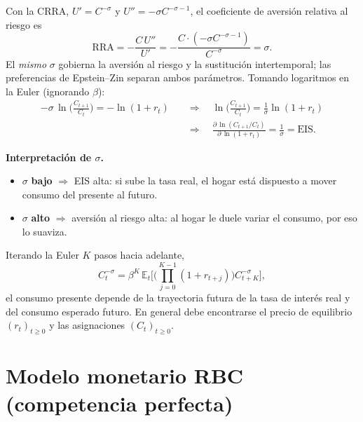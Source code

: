 \documentclass[11pt]{article}
\newenvironment{clave}[1][Idea clave]%
  {\par\medskip\noindent\textbf{#1.}\enspace\ignorespaces}%
  {\par\medskip}
\theoremstyle{definition}
\newcommand{\E}{\mathbb{E}}
\begin{document}
Con la CRRA, $U'=C^{-\sigma}$ y $U''=-\sigma C^{-\sigma-1}$, el coeficiente de aversión relativa al
riesgo es
\begin{equation}
\mathrm{RRA}=-\frac{C\,U''}{U'}=-\frac{C\cdot(-\sigma C^{-\sigma-1})}{C^{-\sigma}}=\sigma .
\end{equation}
El \emph{mismo} $\sigma$ gobierna la aversión al riesgo y la sustitución intertemporal; las
preferencias de Epstein--Zin separan ambos parámetros. Tomando logaritmos en la Euler (ignorando
$\beta$):
\begin{align}
-\sigma\,\ln\!\Big(\tfrac{C_{t+1}}{C_{t}}\Big)=-\ln(1+r_{t})
&\quad\Longrightarrow\quad
\ln\!\Big(\tfrac{C_{t+1}}{C_{t}}\Big)=\frac{1}{\sigma}\ln(1+r_{t}) \\
&\quad\Longrightarrow\quad
\frac{\partial\,\ln(C_{t+1}/C_{t})}{\partial\,\ln(1+r_{t})}=\frac{1}{\sigma}=\text{EIS.}
\end{align}
\begin{clave}[Interpretación de $\sigma$]
\begin{itemize}[leftmargin=1.4em]
\item $\sigma$ \textbf{bajo} $\Rightarrow$ EIS alta: si sube la tasa real, el hogar está dispuesto a
mover consumo del presente al futuro.
\item $\sigma$ \textbf{alto} $\Rightarrow$ aversión al riesgo alta: al hogar le duele variar el consumo,
por eso lo suaviza.
\end{itemize}
\end{clave}
Iterando la Euler $K$ pasos hacia adelante,
\begin{equation}
C_{t}^{-\sigma}=\beta^{K}\,\E_{t}\!\Big[\Big(\textstyle\prod_{j=0}^{K-1}(1+r_{t+j})\Big)C_{t+K}^{-\sigma}\Big],
\end{equation}
el consumo presente depende de la trayectoria futura de la tasa de interés real y del consumo
esperado futuro. En general debe encontrarse el precio de equilibrio $(r_{t})_{t\ge0}$ y las
asignaciones $(C_{t})_{t\ge0}$.

\section{Modelo monetario RBC (competencia perfecta)}
\end{document}
